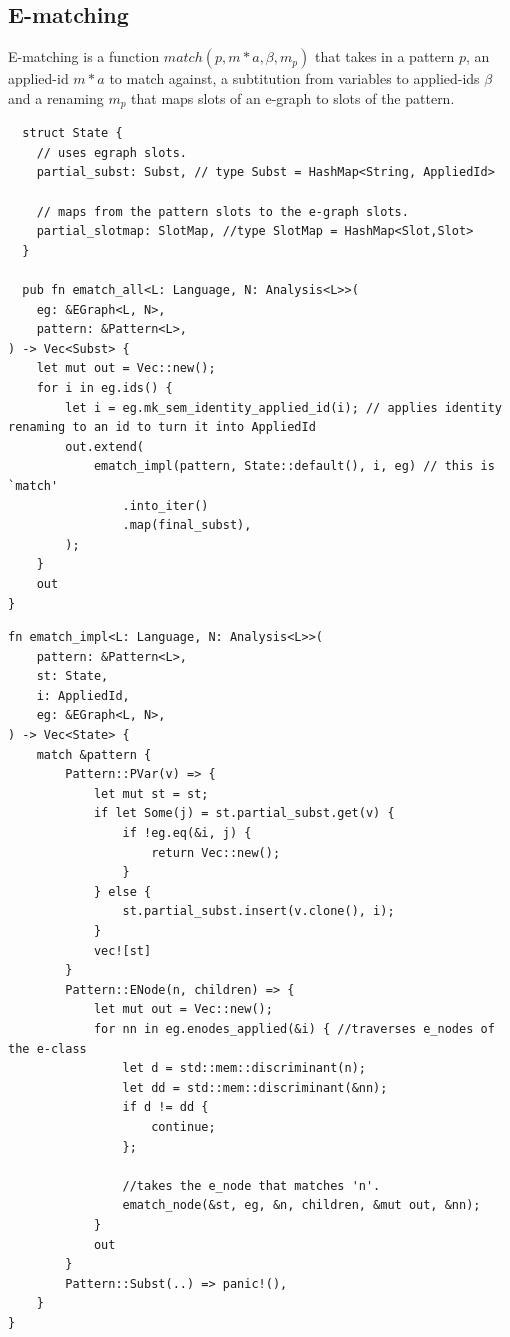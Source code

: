 \documentclass[acmsmall,screen, nonacm, anonymous]{acmart}
\begin{document}
\subsection{E-matching}

E-matching is a function $match(p,m * a, \beta, m_p)$ that takes in a pattern $p$, an applied-id $m*a$ to match against, a subtitution from variables to applied-ids $\beta$ and a renaming $m_p$ that maps slots of an e-graph to slots of the pattern.


\begin{listing}
\begin{verbatim}
  struct State {
    // uses egraph slots.
    partial_subst: Subst, // type Subst = HashMap<String, AppliedId>

    // maps from the pattern slots to the e-graph slots.
    partial_slotmap: SlotMap, //type SlotMap = HashMap<Slot,Slot>
  }

  pub fn ematch_all<L: Language, N: Analysis<L>>(
    eg: &EGraph<L, N>,
    pattern: &Pattern<L>,
) -> Vec<Subst> {
    let mut out = Vec::new();
    for i in eg.ids() {
        let i = eg.mk_sem_identity_applied_id(i); // applies identity renaming to an id to turn it into AppliedId
        out.extend(
            ematch_impl(pattern, State::default(), i, eg) // this is `match'
                .into_iter()
                .map(final_subst),
        );
    }
    out
}

\end{verbatim}
\end{listing}


\begin{listing}
\begin{verbatim}
fn ematch_impl<L: Language, N: Analysis<L>>(
    pattern: &Pattern<L>,
    st: State,
    i: AppliedId,
    eg: &EGraph<L, N>,
) -> Vec<State> {
    match &pattern {
        Pattern::PVar(v) => {
            let mut st = st;
            if let Some(j) = st.partial_subst.get(v) {
                if !eg.eq(&i, j) {
                    return Vec::new();
                }
            } else {
                st.partial_subst.insert(v.clone(), i);
            }
            vec![st]
        }
        Pattern::ENode(n, children) => {
            let mut out = Vec::new();
            for nn in eg.enodes_applied(&i) { //traverses e_nodes of the e-class
                let d = std::mem::discriminant(n);
                let dd = std::mem::discriminant(&nn);
                if d != dd {
                    continue;
                };

                //takes the e_node that matches 'n'.
                ematch_node(&st, eg, &n, children, &mut out, &nn);
            }
            out
        }
        Pattern::Subst(..) => panic!(),
    }
}

\end{verbatim}
\end{listing}
\end{document}
